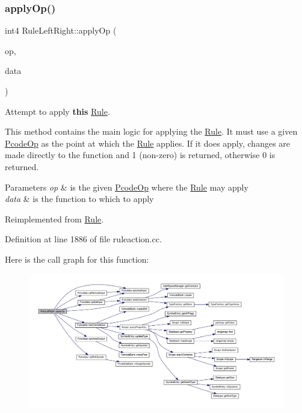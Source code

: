 \subsubsection{\texorpdfstring{applyOp()}{applyOp()}}
{\footnotesize\ttfamily int4 Rule\+Left\+Right\+::apply\+Op (\begin{DoxyParamCaption}\item[{\mbox{\hyperlink{class_pcode_op}{Pcode\+Op}} $\ast$}]{op,  }\item[{\mbox{\hyperlink{class_funcdata}{Funcdata}} \&}]{data }\end{DoxyParamCaption})\hspace{0.3cm}{\ttfamily [virtual]}}



Attempt to apply {\bfseries{this}} \mbox{\hyperlink{class_rule}{Rule}}. 

This method contains the main logic for applying the \mbox{\hyperlink{class_rule}{Rule}}. It must use a given \mbox{\hyperlink{class_pcode_op}{Pcode\+Op}} as the point at which the \mbox{\hyperlink{class_rule}{Rule}} applies. If it does apply, changes are made directly to the function and 1 (non-\/zero) is returned, otherwise 0 is returned. 
\begin{DoxyParams}{Parameters}
{\em op} & is the given \mbox{\hyperlink{class_pcode_op}{Pcode\+Op}} where the \mbox{\hyperlink{class_rule}{Rule}} may apply \\
\hline
{\em data} & is the function to which to apply \\
\hline
\end{DoxyParams}


Reimplemented from \mbox{\hyperlink{class_rule_a4e3e61f066670175009f60fb9dc60848}{Rule}}.



Definition at line 1886 of file ruleaction.\+cc.

Here is the call graph for this function\+:
\nopagebreak
\begin{figure}[H]
\begin{center}
\leavevmode
\includegraphics[width=350pt]{class_rule_left_right_af92aaefc1e7def3b544a0d54adf4018f_cgraph}
\end{center}
\end{figure}
\mbox{\label{class_rule_left_right_aee62a865007b1395cf9716d3e1360111}} 

